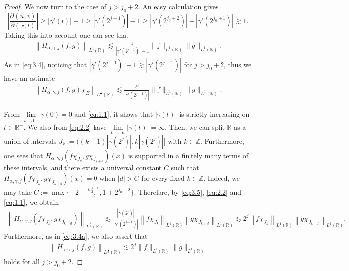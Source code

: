 \documentclass[11pt, twoside, leqno]{article}
\def\gs{\gtrsim}
\theoremstyle{definition}
\numberwithin{equation}{section}
\begin{document}
\begin{proof}
We now turn to the case of $j>j_{0}+2$. An easy calculation gives
$$\left|{\frac{\partial(u,v)}{\partial(x,t)}}\right|\geq|\gamma'(t)|-1\geq|\gamma'(2^{j-1})|-1\geq|\gamma'(2^{j_0+2})|-|\gamma'(2^{j_0+1})|\gs 1.$$
Taking this into account one can see that
\begin{align*}
\left\|H_{\alpha,\gamma,j}(f,g)\right\|_{L^{1}(\mathbb{R})}\lesssim \frac{1}{|\gamma'(2^{j-1})|-1}\|f\|_{L^{1}(\mathbb{R})}\|g\|_{L^{1}(\mathbb{R})}.
 \end{align*}
As in \eqref{eq:3.4}, noticing that $|\gamma'(2^{j-1})|-1 \gs |\gamma'(2^{j-1})|$ for $j>j_{0}+2$, thus we have an estimate
\begin{align}\label{eq:3.5}
\left\|H_{\alpha,\gamma,j}(f,g)\chi_{E}\right\|_{L^{\frac{1}{2}}(\mathbb{R})}\lesssim \frac{|E|}{|\gamma'(2^{j-1})|}\|f\|_{L^{1}(\mathbb{R})}\|g\|_{L^{1}(\mathbb{R})}.
 \end{align}

From $\lim\limits_{t\rightarrow 0^+}\gamma(0)=0$ and \eqref{eq:1.1}, it shows that $|\gamma(t)|$ is strictly increasing on $t\in\mathbb{R}^+$. We also from \eqref{eq:2.2} have $\lim\limits_{t\rightarrow \infty}|\gamma(t)|=\infty$. Then, we can split $\mathbb{R}$ as a  union of intervals $J_k:=((k-1)|\gamma(2^j)|,k|\gamma(2^j)|]$ with $k\in \mathbb{Z}$. Furthermore, one sees that $H_{\alpha,\gamma,j}(f \chi_{J_{k}},g\chi_{J_{k+d}})(x)$ is supported in a finitely many terms of these intervals, and there exists a universal constant $C$ such that $H_{\alpha,\gamma,j}(f \chi_{J_{k}},g\chi_{J_{k+d}})(x)=0$ when $|d| >C$ for every fixed $k\in \mathbb{Z}$. Indeed, we may take $C:=\max \{-2+\frac{C^{(1)}_2}{2},1+2^{{j_0}+2}\}$. Therefore, by \eqref{eq:3.5}, \eqref{eq:2.2} and \eqref{eq:1.1}, we obtain
\begin{align*}
\left\|H_{\alpha,\gamma,j}(f \chi_{J_{k}},g\chi_{J_{k+d}})\right\|_{L^{\frac{1}{2}}(\mathbb{R})}\lesssim \frac{|\gamma(2^j)|}{|\gamma'(2^{j-1})|} \left\|f \chi_{J_{k}}\right\|_{L^{1}(\mathbb{R})}\left\|g\chi_{J_{k+d}}\right\|_{L^{1}(\mathbb{R})}\lesssim 2^j\left\|f \chi_{J_{k}}\right\|_{L^{1}(\mathbb{R})}\left\|g\chi_{J_{k+d}}\right\|_{L^{1}(\mathbb{R})}.
\end{align*}
Furthermore, as in \eqref{eq:3.4a}, we also assert that
\begin{align}\label{eq:3.50}
\left\|H_{\alpha,\gamma,j}(f,g)\right\|_{L^{\frac{1}{2}}(\mathbb{R})}\lesssim2^j\|f\|_{L^{1}(\mathbb{R})}\|g\|_{L^{1}(\mathbb{R})}
\end{align}
 holds for all $j>j_{0}+2$.


\end{proof}
\end{document}

